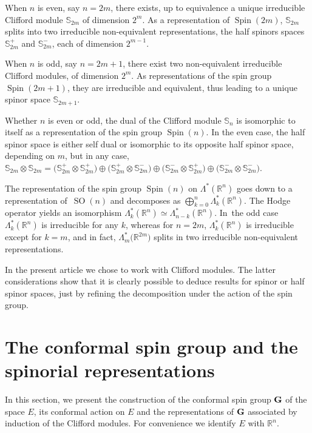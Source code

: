 \documentclass[pdftex]{sigma}
\DeclareMathOperator{\Spin}{Spin}
\DeclareMathOperator{\SO}{SO}
\numberwithin{equation}{section}
\begin{document}
When $n$ is even, say $n=2m$, there exists, up to equivalence a unique irreducible Clifford module $\mathbb S_{2m}$ of dimension $2^m$. As a representation of $\Spin(2m)$, $\mathbb S_{2m}$ splits into two irreducible non-equivalent representations, the half spinors spaces $\mathbb S^+_{2m}$ and $\mathbb S^-_{2m}$, each of dimension $2^{m-1}$.

When $n$ is odd, say $n=2m+1$, there exist two non-equivalent irreducible Clifford modules, of dimension $2^m$. As representations of the spin group $\Spin(2m+1)$, they are irreducible and equivalent, thus leading to a unique spinor space $\mathbb S_{2m+1}$.


Whether $n$ is even or odd, the dual of the Clifford module $\mathbb S_n$ is isomorphic to itself as a representation of the spin group $\Spin(n)$. In the even case, the half spinor space is either self dual or isomorphic to its opposite half spinor space, depending on $m$, but in any case,
$\mathbb S_{2m}\otimes \mathbb S_{2m}= \big(\mathbb S_{2m}^+\otimes \mathbb S_{2m}^+\big)\oplus \big(\mathbb S_{2m}^+\otimes \mathbb S_{2m}^-\big)\oplus \big(\mathbb S_{2m}^-\otimes \mathbb S_{2m}^+\big) \oplus \big( \mathbb S_{2m}^-\otimes \mathbb S_{2m}^-\big)$.

{\sloppy
The representation of the spin group $\Spin(n)$ on $\Lambda^*(\mathbb R^n)$ goes down to a representation of~$\SO(n)$ and decomposes as $\bigoplus_{k=0}^n \Lambda^*_k(\mathbb R^n)$. The Hodge operator yields an isomorphism \mbox{$\Lambda^*_k(\mathbb R^n) \simeq \Lambda^*_{n-k}(\mathbb R^n)$}. In~the odd case $\Lambda^*_k(\mathbb R^n)$ is irreducible for any $k$, whereas for $n=2m$, $\Lambda^*_k(\mathbb R^n)$ is irreducible except for $k=m$, and in fact, $\Lambda^*_m\big(\mathbb R^{2m}\big)$ splits in two irreducible non-equivalent representations.

}

 In the present article we chose to work with Clifford modules. The latter considerations show that it is clearly possible to deduce results for spinor or half spinor spaces, just by refining the decomposition under the action of the spin group.

\section{The conformal spin group and the spinorial representations}

In this section, we present the construction of the conformal spin group $\bf G$ of the space $E$, its conformal action on $E$ and the representations of $\bf G$ associated by induction of the Clifford modules. For convenience we identify $E$ with $\mathbb R^n$.
\end{document}
